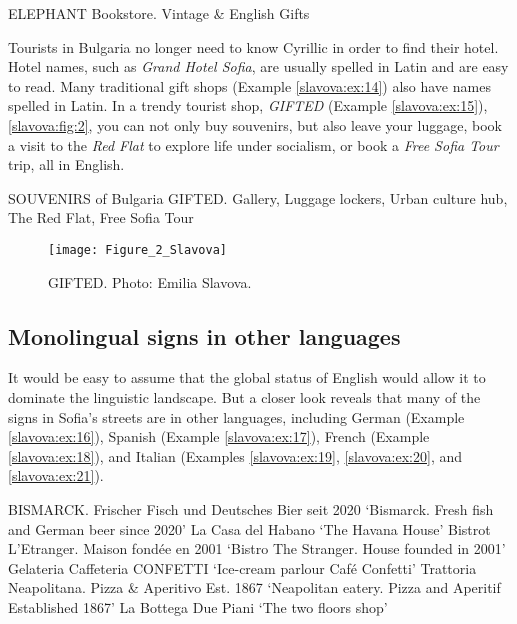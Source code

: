 \documentclass[output=paper]{langscibook}
\begin{document}
\begin{exe}
  \ex\label{slavova:ex:13} ELEPHANT Bookstore. Vintage \& English Gifts
\end{exe}

Tourists in Bulgaria no longer need to know Cyrillic in order to find their hotel. Hotel names, such as \textit{Grand Hotel Sofia}, are usually spelled in Latin and are easy to read. Many traditional gift shops (Example \ref{slavova:ex:14}) also have names spelled in Latin. In a trendy tourist shop, \textit{GIFTED} (Example \ref{slavova:ex:15}), \autoref{slavova:fig:2}, you can not only buy souvenirs, but also leave your luggage, book a visit to the \textit{Red Flat} to explore life under socialism, or book a \textit{Free Sofia Tour} trip, all in English.

\begin{exe}
  \ex\label{slavova:ex:14} SOUVENIRS of Bulgaria
  \ex\label{slavova:ex:15} GIFTED. Gallery, Luggage lockers, Urban culture hub, The Red Flat, Free Sofia Tour
\end{exe}

\begin{figure} %
  \texttt{[image: Figure\_2\_Slavova]}
  \caption{GIFTED. Photo: Emilia Slavova.}
  \label{slavova:fig:2}
\end{figure}

\subsection{Monolingual signs in other languages}
It would be easy to assume that the global status of English would allow it to dominate the linguistic landscape. But a closer look reveals that many of the signs in Sofia’s streets are in other languages, including German (Example \ref{slavova:ex:16}),
 Spanish (Example \ref{slavova:ex:17}), French (Example \ref{slavova:ex:18}),
  and Italian (Examples \ref{slavova:ex:19},  \ref{slavova:ex:20}, and \ref{slavova:ex:21}).

  \largerpage
\begin{exe}
  \ex\label{slavova:ex:16} BISMARCK. Frischer Fisch und Deutsches Bier seit 2020
  \glt ‘Bismarck. Fresh fish and German beer since 2020’
  \ex\label{slavova:ex:17} La Casa del Habano 
  \glt ‘The Havana House’ 
  \ex\label{slavova:ex:18} Bistrot L’Etranger. Maison fondée en 2001 
  \glt ‘Bistro The Stranger. House founded in 2001’ 
  \ex\label{slavova:ex:19} Gelateria Caffeteria CONFETTI 
  \glt ‘Ice-cream parlour Café Confetti’ 
  \ex\label{slavova:ex:20} Trattoria Neapolitana. Pizza \& Aperitivo Est. 1867 
  \glt ‘Neapolitan eatery. Pizza and Aperitif Established 1867’ 
  \ex\label{slavova:ex:21} La Bottega Due Piani 
  \glt ‘The two floors shop’
\end{exe}
\end{document}
